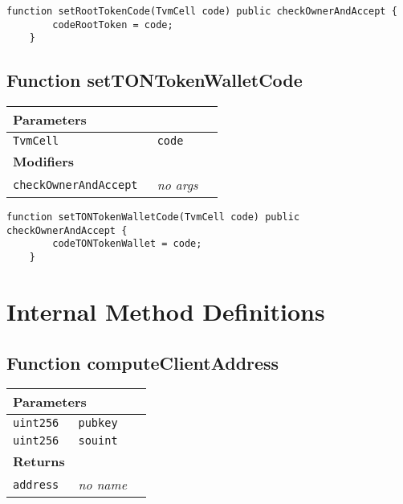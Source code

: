 \vspace{2cm}

\begin{lstlisting}[firstnumber=92]
	function setRootTokenCode(TvmCell code) public checkOwnerAndAccept {
		codeRootToken = code;
	}
\end{lstlisting}

\subsection{Function setTONTokenWalletCode}


\ifsoltables
\noindent\begin{tabular}{|l|l|p{5cm}|}\hline
\multicolumn{3}{|l|}{\bf Parameters}\\\hline
\tt TvmCell & \tt code &\\\hline
\multicolumn{3}{|l|}{\bf Modifiers}\\\hline
\tt checkOwnerAndAccept & {\em no args} &\\\hline
\end{tabular}
\fi

\vspace{2cm}

\begin{lstlisting}[firstnumber=96]
	function setTONTokenWalletCode(TvmCell code) public checkOwnerAndAccept {
		codeTONTokenWallet = code;
	}
\end{lstlisting}

\section{Internal Method Definitions}


\subsection{Function computeClientAddress}


\ifsoltables
\noindent\begin{tabular}{|l|l|p{5cm}|}\hline
\multicolumn{3}{|l|}{\bf Parameters}\\\hline
\tt uint256 & \tt pubkey &\\\hline
\tt uint256 & \tt souint &\\\hline
\multicolumn{3}{|l|}{\bf Returns}\\\hline
\tt address & {\em no name} &\\\hline
\end{tabular}
\fi

\vspace{2cm}

